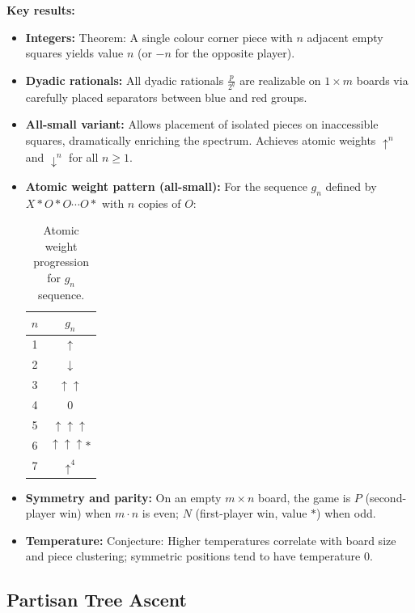 \documentclass[10pt,a4paper,twocolumn]{article}
\theoremstyle{plain}
\theoremstyle{definition}
\theoremstyle{remark}
\begin{document}
\textbf{Key results:}
\begin{itemize}
\item \textbf{Integers:} Theorem: A single colour corner piece with $n$ adjacent empty squares yields value $n$ (or $-n$ for the opposite player).
\item \textbf{Dyadic rationals:} All dyadic rationals $\frac{p}{2^q}$ are realizable on $1 \times m$ boards via carefully placed separators between blue and red groups.
\item \textbf{All-small variant:} Allows placement of isolated pieces on inaccessible squares, dramatically enriching the spectrum. Achieves atomic weights $\uparrow^n$ and $\downarrow^n$ for all $n \ge 1$.
\item \textbf{Atomic weight pattern (all-small):} For the sequence $g_n$ defined by $X * O * O \cdots O *$ with $n$ copies of $O$:
\begin{table}[ht]
\centering
\small
\begin{tabular}{@{}cc@{}}
\toprule
$n$ & $g_n$ \\
\midrule
1 & $\uparrow$ \\
2 & $\downarrow$ \\
3 & $\uparrow\uparrow$ \\
4 & $0$ \\
5 & $\uparrow\uparrow\uparrow$ \\
6 & $\uparrow\uparrow\uparrow*$ \\
7 & $\uparrow^4$ \\
\bottomrule
\end{tabular}
\caption{Atomic weight progression for $g_n$ sequence.}
\end{table}
\vspace{8pt}
\item \textbf{Symmetry and parity:} On an empty $m \times n$ board, the game is $P$ (second-player win) when $m \cdot n$ is even; $N$ (first-player win, value $*$) when odd.
\item \textbf{Temperature:} Conjecture: Higher temperatures correlate with board size and piece clustering; symmetric positions tend to have temperature $0$.
\end{itemize}

\vspace{14pt}

\subsection{Partisan Tree Ascent}
\end{document}
